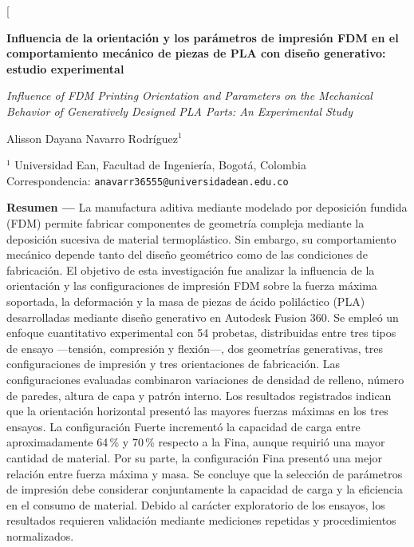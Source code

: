 \documentclass[10pt,twocolumn]{article}
\begin{document}
\twocolumn[{%
\begin{center}
{\Large\bfseries\color{navy} Influencia de la orientación y los parámetros de impresión FDM en el comportamiento mecánico de piezas de PLA con diseño generativo: estudio experimental\par}
\vspace{3pt}
{\itshape\small Influence of FDM Printing Orientation and Parameters on the Mechanical Behavior of Generatively Designed PLA Parts: An Experimental Study\par}
\vspace{5pt}
Alisson Dayana Navarro Rodríguez$^{1}$\par\vspace{2pt}
{\small $^{1}$ Universidad Ean, Facultad de Ingeniería, Bogotá, Colombia\\
Correspondencia: \texttt{anavarr36555@universidadean.edu.co}}
\end{center}
\vspace{2pt}
\begin{tcolorbox}[colback=white,colframe=navy!55,boxrule=0.5pt,arc=1pt,left=5pt,right=5pt,top=3pt,bottom=3pt]
\small\textbf{Resumen ---} La manufactura aditiva mediante modelado por deposición fundida (FDM) permite fabricar componentes de geometría compleja mediante la deposición sucesiva de material termoplástico. Sin embargo, su comportamiento mecánico depende tanto del diseño geométrico como de las condiciones de fabricación. El objetivo de esta investigación fue analizar la influencia de la orientación y las configuraciones de impresión FDM sobre la fuerza máxima soportada, la deformación y la masa de piezas de ácido poliláctico (PLA) desarrolladas mediante diseño generativo en Autodesk Fusion 360. Se empleó un enfoque cuantitativo experimental con 54 probetas, distribuidas entre tres tipos de ensayo ---tensión, compresión y flexión---, dos geometrías generativas, tres configuraciones de impresión y tres orientaciones de fabricación. Las configuraciones evaluadas combinaron variaciones de densidad de relleno, número de paredes, altura de capa y patrón interno. Los resultados registrados indican que la orientación horizontal presentó las mayores fuerzas máximas en los tres ensayos. La configuración Fuerte incrementó la capacidad de carga entre aproximadamente 64\,\% y 70\,\% respecto a la Fina, aunque requirió una mayor cantidad de material. Por su parte, la configuración Fina presentó una mejor relación entre fuerza máxima y masa. Se concluye que la selección de parámetros de impresión debe considerar conjuntamente la capacidad de carga y la eficiencia en el consumo de material. Debido al carácter exploratorio de los ensayos, los resultados requieren validación mediante mediciones repetidas y procedimientos normalizados.


\end{tcolorbox}}
\end{document}
